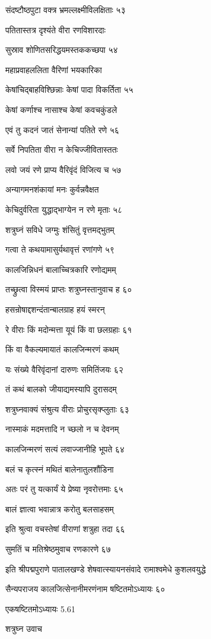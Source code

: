 संदष्टौष्ठपुटा वक्त्र भ्रमल्लक्ष्मीविलक्षिताः ५३

पतितास्तत्र दृश्यंते वीरा रणविशारदाः

सुस्राव शोणितसरिद्धयमस्तककच्छपा ५४

महाप्रवाहललिता वैरिणां भयकारिका

केषांचिद्बाहविश्छिन्नाः केषां पादा विकर्तिता ५५

केषां कर्णाश्च नासाश्च केषां कवचकुंडले

एवं तु कदनं जातं सेनान्यां पतिते रणे ५६

सर्वे निपतिता वीरा न केचिज्जीवितास्ततः

लवो जयं रणे प्राप्य वैरिवृंदं विजित्य च ५७

अन्यागमनशंकायां मनः कुर्वन्नवैक्षत

केचिदुर्वरिता युद्धाद्भाग्येन न रणे मृताः ५८

शत्रुघ्नं सविधे जग्मुः शंसितुं वृत्तमद्भुतम्

गत्वा ते कथयामासुर्यथावृत्तं रणांगणे ५९

कालजिन्निधनं बालाच्चित्रकारि रणोद्यमम्

तच्छ्रुत्वा विस्मयं प्राप्तः शत्रुघ्नस्तानुवाच ह ६०

हसन्रोषाद्दशन्दंतान्बालग्राह हयं स्मरन्

रे वीराः किं मदोन्मत्ता यूयं किं वा छलग्रहाः ६१

किं वा वैकल्यमायातं कालजिन्मरणं कथम्

यः संख्ये वैरिवृंदानां दारुणः समितिंजयः ६२

तं कथं बालको जीयाद्यमस्यापि दुरासदम्

शत्रुघ्नवाक्यं संश्रुत्य वीराः प्रोचुरसृक्प्लुताः ६३

नास्माकं मदमत्तादि न च्छलो न च देवनम्

कालजिन्मरणं सत्यं लवाज्जानीहि भूपते ६४

बलं च कृत्स्नं मथितं बालेनातुलशौंडिना

अतः परं तु यत्कार्यं ये प्रेष्या नृवरोत्तमाः ६५

बालं ज्ञात्वा भवान्नात्र करोतु बलसाहसम्

इति श्रुत्वा वचस्तेषां वीराणां शत्रुहा तदा ६६

सुमतिं च मतिश्रेष्ठमुवाच रणकारणे ६७

इति श्रीपद्मपुराणे पातालखण्डे शेषवात्स्यायनसंवादे रामाश्वमेधे कुशलवयुद्धे

सैन्यपराजय कालजित्सेनानीमरणंनाम षष्टितमोऽध्यायः ६०

एकषष्टितमोऽध्यायः 5.61

शत्रुघ्न उवाच

